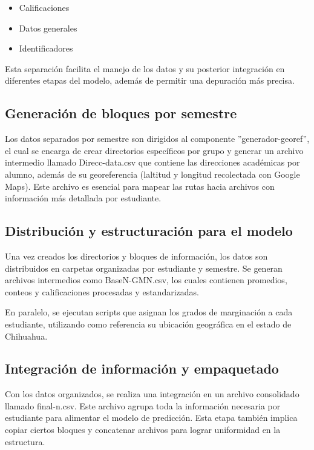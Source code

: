 \documentclass[10pt,a4paper]{report}
\begin{document}
\begin{itemize}
\item Calificaciones
\item Datos generales
\item Identificadores
\end{itemize} 

Esta separación facilita el manejo de los datos y su posterior integración en diferentes etapas del modelo, además de permitir una depuración más precisa.

\subsection{Generación de bloques por semestre}

Los datos separados por semestre son dirigidos al componente ''generador-georef'', el cual se encarga de crear directorios específicos por grupo y generar un archivo intermedio llamado Direcc-data.csv que contiene las direcciones académicas por alumno, además de su georeferencia (laltitud y longitud recolectada con Google Maps). Este archivo es esencial para mapear las rutas hacia archivos con información más detallada por estudiante.

\subsection{Distribución y estructuración para el modelo}

Una vez creados los directorios y bloques de información, los datos son distribuidos en carpetas organizadas por estudiante y semestre. Se generan archivos intermedios como BaseN-GMN.csv, los cuales contienen promedios, conteos y calificaciones procesadas y estandarizadas.

\bigskip

En paralelo, se ejecutan scripts que asignan los grados de marginación a cada estudiante, utilizando como referencia su ubicación geográfica en el estado de Chihuahua.

\subsection{Integración de información y empaquetado}

Con los datos organizados, se realiza una integración en un archivo consolidado llamado final-n.csv. Este archivo agrupa toda la información necesaria por estudiante para alimentar el modelo de predicción. Esta etapa también implica copiar ciertos bloques y concatenar archivos para lograr uniformidad en la estructura.
\end{document}
